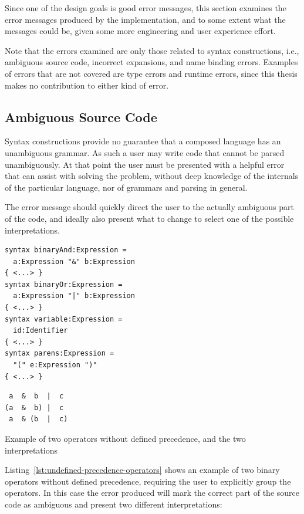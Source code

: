 \documentclass{kththesis}
\begin{document}
Since one of the design goals is good error messages, this section examines the error messages produced by the implementation, and to some extent what the messages could be, given some more engineering and user experience effort.

Note that the errors examined are only those related to syntax constructions, i.e., ambiguous source code, incorrect expansions, and name binding errors. Examples of errors that are not covered are type errors and runtime errors, since this thesis makes no contribution to either kind of error.

\subsection{Ambiguous Source Code} \label{sec:errors-ambiguous}

Syntax constructions provide no guarantee that a composed language has an unambiguous grammar. As such a user may write code that cannot be parsed unambiguously. At that point the user must be presented with a helpful error that can assist with solving the problem, without deep knowledge of the internals of the particular language, nor of grammars and parsing in general.

The error message should quickly direct the user to the actually ambiguous part of the code, and ideally also present what to change to select one of the possible interpretations.

\begin{listing}[t]
\begin{verbatim}
syntax binaryAnd:Expression =
  a:Expression "&" b:Expression
{ <...> }
syntax binaryOr:Expression =
  a:Expression "|" b:Expression
{ <...> }
syntax variable:Expression =
  id:Identifier
{ <...> }
syntax parens:Expression =
  "(" e:Expression ")"
{ <...> }
\end{verbatim}
\begin{verbatim}
 a  &  b  |  c
(a  &  b) |  c
 a  & (b  |  c)
\end{verbatim}
\caption{Example of two operators without defined precedence, and the two interpretations}
\label{lst:undefined-precedence-operators}
\end{listing}

Listing~\ref{lst:undefined-precedence-operators} shows an example of two binary operators without defined precedence, requiring the user to explicitly group the operators. In this case the error produced will mark the correct part of the source code as ambiguous and present two different interpretations:
\end{document}
